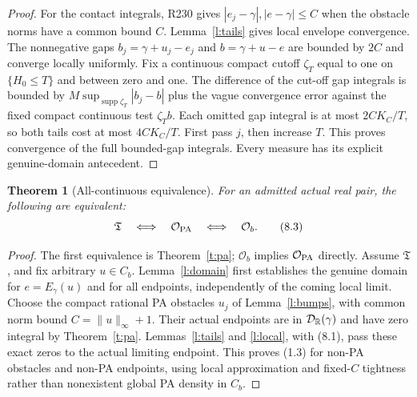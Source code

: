 \documentclass[11pt]{article}
\newtheorem{theorem}{Theorem}[section]
\begin{document}
\begin{proof}
For the contact integrals, R230 gives $|e_j-\gamma|,|e-\gamma|\leq C$ when the obstacle norms have a common bound $C$. Lemma~\ref{l:tails} gives local envelope convergence. The nonnegative gaps $b_j=\gamma+u_j-e_j$ and $b=\gamma+u-e$ are bounded by $2C$ and converge locally uniformly. Fix a continuous compact cutoff $\zeta_T$ equal to one on $\{H_0\leq T\}$ and between zero and one. The difference of the cut-off gap integrals is bounded by $M\sup_{\operatorname{supp}\zeta_T}|b_j-b|$ plus the vague convergence error against the fixed compact continuous test $\zeta_T b$. Each omitted gap integral is at most $2C K_C/T$, so both tails cost at most $4C K_C/T$. First pass $j$, then increase $T$. This proves convergence of the full bounded-gap integrals. Every measure has its explicit genuine-domain antecedent.
\end{proof}

\begin{theorem}[All-continuous equivalence]\label{t:all}
For an admitted actual real pair, the following are equivalent:
\[
                 \mathfrak T\quad\Longleftrightarrow\quad
                 \mathcal O_{\rm PA}\quad\Longleftrightarrow\quad
                 \mathcal O_b.                                      \tag{8.3}
\]
\end{theorem}
\begin{proof}
The first equivalence is Theorem~\ref{t:pa}; $\mathcal O_b$ implies $\mathcal O_{\rm PA}$ directly. Assume $\mathfrak T$, and fix arbitrary $u\in C_b$. Lemma~\ref{l:domain} first establishes the genuine domain for $e=E_\gamma(u)$ and for all endpoints, independently of the coming local limit. Choose the compact rational PA obstacles $u_j$ of Lemma~\ref{l:bumps}, with common norm bound $C=\|u\|_\infty+1$. Their actual endpoints are in $\mathcal D_\mathbb R(\gamma)$ and have zero integral by Theorem~\ref{t:pa}. Lemmas~\ref{l:tails} and \ref{l:local}, with (8.1), pass these exact zeros to the actual limiting endpoint. This proves (1.3) for non-PA obstacles and non-PA endpoints, using local approximation and fixed-$C$ tightness rather than nonexistent global PA density in $C_b$.
\end{proof}
\end{document}
